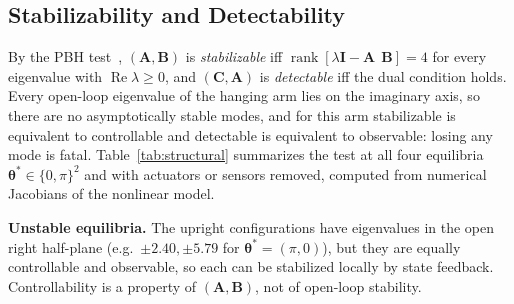 \documentclass[letterpaper, 10pt, conference]{ieeeconf}
\begin{document}
\subsection{Stabilizability and Detectability}
\label{sec:structural}

By the PBH test~\cite{chen1999}, $(\mathbf{A},\mathbf{B})$ is
\emph{stabilizable} iff
$\operatorname{rank}[\lambda\mathbf{I}-\mathbf{A}\ \ \mathbf{B}]=4$
for every eigenvalue with $\operatorname{Re}\lambda\ge0$, and
$(\mathbf{C},\mathbf{A})$ is \emph{detectable} iff the dual
condition holds. Every open-loop eigenvalue of the hanging
arm lies on the imaginary axis, so there are no
asymptotically stable modes, and for this arm stabilizable is
equivalent to controllable and detectable is equivalent to
observable: losing any mode is fatal. Table~\ref{tab:structural}
summarizes the test at all four equilibria
$\boldsymbol{\theta}^*\in\{0,\pi\}^2$ and with actuators or sensors
removed, computed from numerical Jacobians of the nonlinear
model.

\begin{table}[htbp]
\centering
\caption{Structural properties of the linearization (rank out of 4).}
\label{tab:structural}
\end{table}

\textbf{Unstable equilibria.} The upright configurations
have eigenvalues in the open right half-plane (e.g.\
$\pm2.40,\pm5.79$ for $\boldsymbol{\theta}^*=(\pi,0)$), but they are
equally controllable and observable, so each can be
stabilized locally by state feedback. Controllability is a
property of $(\mathbf{A},\mathbf{B})$, not of open-loop stability.
\end{document}
